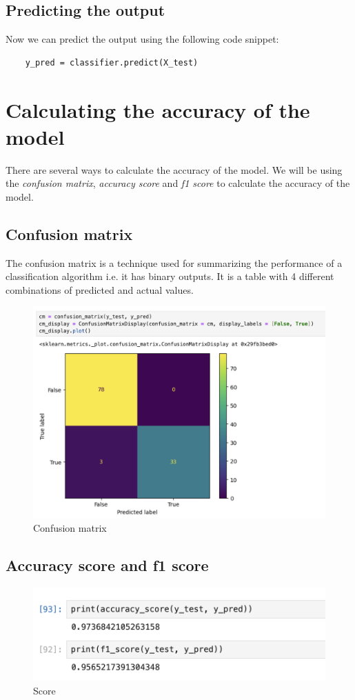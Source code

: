 \subsection{Predicting the output}
Now we can predict the output using the following code snippet:
\begin{lstlisting}
    y_pred = classifier.predict(X_test)
\end{lstlisting}

\section{Calculating the accuracy of the model}
There are several ways to calculate the accuracy of the model. 
We will be using the \textit{confusion matrix}, \textit{accuracy score} and \textit{f1 score} to calculate the accuracy of the model.
\subsection{Confusion matrix}
The confusion matrix is a technique used for summarizing the performance of a classification algorithm i.e. it has binary outputs. It is a table with 4 different combinations of predicted and actual values.
\begin{figure}[h]
    \centering
    \includegraphics[width=12cm]{ch/figures/cm.png}
    \caption{Confusion matrix}
    \label{fig:cm}
\end{figure}
\newpage
\subsection{Accuracy score and f1 score}
\begin{figure}[h]
    \centering
    \includegraphics[width=12cm]{ch/figures/score.png}
    \caption{Score}
    \label{fig:score}
\end{figure}

